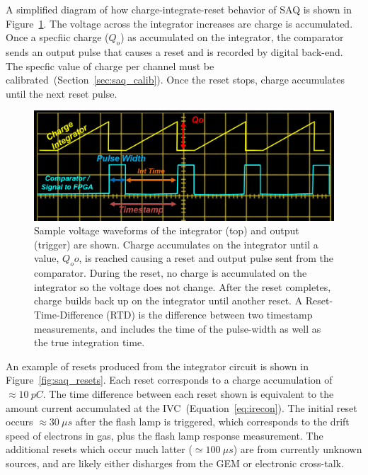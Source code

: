 A simplified diagram of how charge-integrate-reset behavior of SAQ is shown in Figure~\ref{fig:saq_reconstruction}.
The voltage across the integrator increases are charge is accumulated.
Once a specfiic charge ($Q_{o}$) as accumulated on the integrator, the comparator sends an output pulse that causes a reset and is recorded by digital back-end.
The specfic value of charge per channel must be calibrated~(Section~\ref{sec:saq_calib}).
Once the reset stops, charge accumulates until the next reset pulse.

\begin{figure}[]
\centering
\includegraphics[width=\textwidth]{images/saq_example_reconstruction.png}
\caption{Sample voltage waveforms of the integrator (top) and output (trigger) are shown.
Charge accumulates on the integrator until a value, $Q_o{o}$, is reached causing a reset and output pulse sent from the comparator.
During the reset, no charge is accumulated on the integrator so the voltage does not change.
After the reset completes, charge builds back up on the integrator until another reset.
A Reset-Time-Difference (RTD) is the difference between two timestamp measurements, and includes the time of the pulse-width as well as the true integration time.
}
\label{fig:saq_reconstruction}
\end{figure}

An example of resets produced from the integrator circuit is shown in Figure~\ref{fig:saq_resets}.
Each reset corresponds to a charge accumulation of $\approx 10~\unit{pC}$.
The time difference between each reset shown is equivalent to the amount current accumulated at the IVC~(Equation~\ref{eq:irecon}).
The initial reset occurs $\approx 30~\unit{\mu s}$ after the flash lamp is triggered, which corresponds to the drift speed of electrons in gas, plus the flash lamp response measurement.
The additional resets which occur much latter ($\simeq 100~\unit{\mu s}$) are from currently unknown sources, and are likely either disharges from the GEM or electronic cross-talk.

